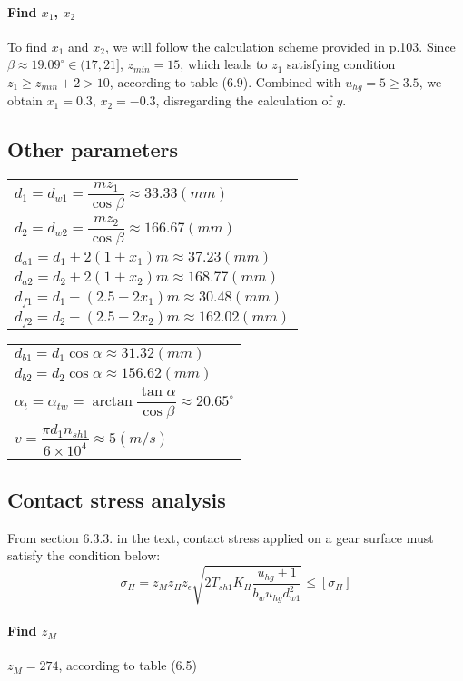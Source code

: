\paragraph{Find $ x_1 $, $ x_2 $} To find $ x_1 $ and $ x_2 $, we will follow the calculation scheme provided in p.103. Since $ \beta \approx 19.09^\circ \in (17,21]$, $ z_{min} = 15$, which leads to $ z_1 $ satisfying condition $ z_1 \geq z_{min} + 2 > 10 $, according to table (6.9). Combined with $ u_{hg} = 5 \geq 3.5 $, we obtain $ x_1 = 0.3 $, $ x_2 = -0.3 $, disregarding the calculation of $ y $.

\subsection{Other parameters}

\begin{tabular}[t]{p{8cm}}
	$ d_1 = d_{w1} = \dfrac{mz_1}{\cos\beta} \approx 33.33\unit{(mm)} $\\
	$ d_2 = d_{w2} = \dfrac{mz_2}{\cos\beta} \approx 166.67 \unit{(mm)} $\\
	$ d_{a1} = d_1 + 2(1+x_1)m \approx 37.23\unit{(mm)}$\\
	$ d_{a2} = d_2 + 2(1+x_2)m \approx 168.77\unit{(mm)}$\\
	$ d_{f1} = d_1 - (2.5-2x_1)m \approx 30.48\unit{(mm)}$\\
	$ d_{f2} = d_2 - (2.5-2x_2)m \approx 162.02\unit{(mm)}$\\
\end{tabular}
\begin{tabular}[t]{p{8cm}}
	$ d_{b1} = d_1\cos\alpha \approx 31.32\unit{(mm)}$\\
	$ d_{b2} = d_2\cos\alpha \approx 156.62 \unit{(mm)}$\\
	$ \alpha_t = \alpha_{tw} = \arctan\dfrac{\tan\alpha}{\cos\beta} \approx 20.65^\circ $\\
	$ v = \dfrac{\pi d_1n_{sh1}}{6\times10^4} \approx 5\unit{(m/s)}$
\end{tabular}

\subsection{Contact stress analysis}
From section 6.3.3. in the text, contact stress applied on a gear surface must satisfy the condition below:
\[
	\sigma_H = z_Mz_Hz_\epsilon\sqrt{2T_{sh1}K_H\dfrac{u_{hg}+1}{b_wu_{hg}d_{w1}^2}} \leq [\sigma_H]
\]

\paragraph{Find $ z_M $}
$ z_M = 274 $, according to table (6.5) 
